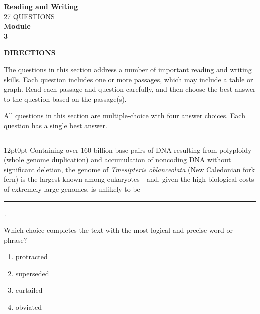 \documentclass[11pt, twocolumn]{article}
\newcommand{\currentmodulename}{}
\newcommand{\setmodulename}[1]{\renewcommand{\currentmodulename}{#1}}
\newcounter{questionnum}
\begin{document}
\setmodulename{Hard}
\onecolumn
\newpage
\thispagestyle{plainpage}
\setcounter{questionnum}{0}
\begin{center}
{\Large\textbf{Reading and Writing}}\\[6pt]
{\large 27 QUESTIONS}\\[4pt]
{\large\textbf{Module}}\\
{\Large\textbf{3}}
\end{center}
\vspace{8pt}
\textbf{DIRECTIONS}

The questions in this section address a number of important reading and writing skills. Each question includes one or more passages, which may include a table or graph. Read each passage and question carefully, and then choose the best answer to the question based on the passage(s).

All questions in this section are multiple-choice with four answer choices. Each question has a single best answer.
\vspace{8pt}
\hrule
\vspace{8pt}
\twocolumn
\pagestyle{questionpage}

\vspace{6pt}\noindent
\begin{minipage}{\columnwidth}\raggedright
\noindent{}\par\vspace{8pt}
\begin{adjustwidth}{12pt}{0pt}
Containing over 160 billion base pairs of DNA resulting from polyploidy (whole genome duplication) and accumulation of noncoding DNA without significant deletion, the genome of \textit{Tmesipteris oblanceolata} (New Caledonian fork fern) is the largest known among eukaryotes---and, given the high biological costs of extremely large genomes, is unlikely to be \,\rule{2cm}{0.4pt}\,.
\vspace{6pt}

Which choice completes the text with the most logical and precise word or phrase?
\begin{enumerate}[label=\Alph*),leftmargin=18pt,topsep=3pt,itemsep=2pt]
  \item protracted
  \item superseded
  \item curtailed
  \item obviated
\end{enumerate}
\end{adjustwidth}
\end{minipage}\par
\end{document}
